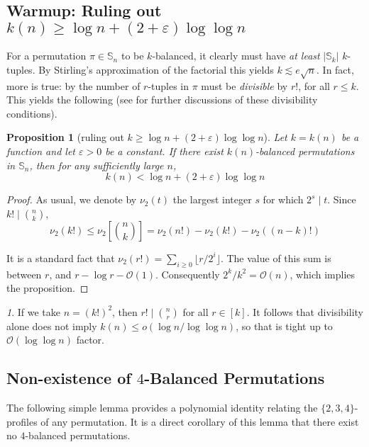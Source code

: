 \documentclass{article}
\newtheorem{proposition}[theorem]{Proposition}
\newcommand{\Sn}{\mathbb{S}_n}
\theoremstyle{remark}
\newtheorem{rem}[theorem]{\protect\remarkname}
\providecommand{\remarkname}{Remark}
\theoremstyle{plain}
\begin{document}
\subsection{Warmup: Ruling out \texorpdfstring{$k(n) \ge \log n + (2 + \varepsilon)\log \log n$}{k>=logn+(2+eps)loglogn}}

For a permutation $\pi \in \Sn$ to be $k$-balanced, it clearly must have \emph{at least} $|\mathbb{S}_k|$ $k$-tuples. By Stirling's approximation of the factorial this yields $k \lesssim e \sqrt{n}$. In fact, more is true: by  the number of $r$-tuples in $\pi$ must be \emph{divisible} by $r!$, for all $r \le k$. This yields the following (see \cite{cooper2008symmetric} for further discussions of these divisibility conditions).

\begin{proposition}[ruling out $k \ge \log n + (2 + \varepsilon)\log \log n$]
    \label{prop:div_rule_bal}
    Let $k=k(n)$ be a function and let $\varepsilon > 0$ be a constant. If there exist $k(n)$-balanced permutations in $\Sn$, then for any sufficiently large $n$,
    \[ k(n) < \log n + (2 + \varepsilon) \log \log n \]
\end{proposition}
\begin{proof}
As usual, we denote by $\nu_2(t)$ the largest integer $s$ for which $2^s \mid t$.
Since $k!\mid \binom{n}{k}$,
    \[
        \nu_2(k!) \leq \nu_2 \left[ \binom{n}{k} \right] = \nu_2(n!) - \nu_2(k!) - \nu_2((n-k)!)
    \]
    
    It is a standard fact that $\nu_2(r!)=\sum_{i\geq 0} \lfloor r/2^i\rfloor$. The value of this sum is between
    $r$, and $r - \log r - \mathcal{O}(1)$. Consequently $2^k / k^2 = \mathcal{O}(n)$, which implies the proposition. 
\end{proof}

\begin{rem}
If we take $n=(k!)^2$, then $r! \mid \binom{n}{r}$ for all $r \in [k]$. It follows that divisibility alone does not imply $k(n) \le o(\log n/\log \log n)$, so that  is tight up to $\mathcal{O}(\log \log n)$ factor.
\end{rem}

\subsection{Non-existence of \texorpdfstring{$4$}{4}-Balanced Permutations}

The following simple lemma provides a polynomial identity relating the $\{2,3,4\}$-profiles of any permutation. It is a direct corollary of this lemma that there exist no $4$-balanced permutations.
\end{document}
